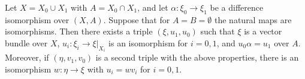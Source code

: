 Let $X = X_0 \cup X_1$ with $A = X_0 \cap X_1$, and let $\alpha: \xi_0 \to \xi_1$ be a difference isomorphism over $(X, A)$. Suppose that for $A = B = \emptyset$ the natural maps are isomorphisms. Then there exists a triple $(\xi, u_1, u_0)$ such that $\xi$ is a vector bundle over $X$, $u_i: \xi_i \to \xi|_{X_i}$ is an isomorphism for $i = 0, 1$, and $u_0 \alpha = u_1$ over $A$. Moreover, if $(\eta, v_1, v_0)$ is a second triple with the above properties, there is an isomorphism $w: \eta \to \xi$ with $u_i = w v_i$ for $i = 0, 1$.
